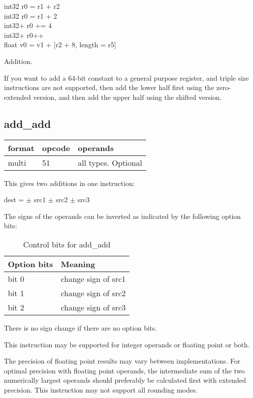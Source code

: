 \documentclass[forwardcom.tex]{subfiles}
\begin{document}
int32 r0 = r1 + r2 \\
int32 r0 = r1 + 2 \\
int32+ r0 += 4 \\
int32+ r0++ \\
float v0 = v1 + [r2 + 8, length = r5]
\vv

Addition.
\vv

If you want to add a 64-bit constant to a general purpose register, and triple size instructions are not supported, then add the lower half first using the zero-extended version, and then add the upper half using the shifted version.
\vv

\subsection{add\_add}
\label{table:addAddInstruction}
\begin{tabular}{|p{12mm}|p{15mm}|p{100mm}|}
\hline
\bfseries format & \bfseries opcode & \bfseries operands \\ \hline
multi & 51 & all types. Optional \\ \hline
\end{tabular}
\vspace{3mm}

This gives two additions in one instruction:
\vv

dest = $\pm$ src1 $\pm$ src2 $\pm$ src3
\vv

The signs of the operands can be inverted as indicated by the following option bits:

\begin{longtable} {|p{20mm}|p{75mm}|}
\caption{Control bits for add\_add} 
\label{table:ControlBitsForAddAdd} \\
\endfirsthead
\endhead
\hline
\bfseries Option bits & \bfseries Meaning   \\
\hline
bit 0 & change sign of src1 \\
bit 1 & change sign of src2 \\
bit 2 & change sign of src3 \\
\hline
\end{longtable}

There is no sign change if there are no option bits. 
\vv

This instruction may be supported for integer operands or floating point or both.
\vv

The precision of floating point results may vary between implementations. For optimal precision with floating point operands, the intermediate sum of the two numerically largest operands should preferably be calculated first with extended precision. This instruction may not support all rounding modes.
\vv
\end{document}
